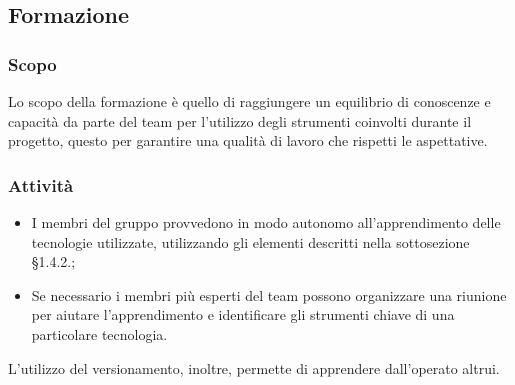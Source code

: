 \subsection{Formazione}

\subsubsection{Scopo}
Lo scopo della formazione è quello di raggiungere un equilibrio di conoscenze e capacità da parte del team per l'utilizzo degli strumenti coinvolti durante il progetto, questo per garantire una qualità di lavoro che rispetti le aspettative.

\subsubsection{Attività}
\begin{itemize}
	\item I membri del gruppo provvedono in modo autonomo all'apprendimento delle tecnologie utilizzate, utilizzando gli elementi descritti nella sottosezione §1.4.2.;
	\item Se necessario i membri più esperti del team possono organizzare una riunione per aiutare l'apprendimento e identificare gli strumenti chiave di una particolare tecnologia.
\end{itemize}
L'utilizzo del versionamento, inoltre, permette di apprendere dall'operato altrui.


